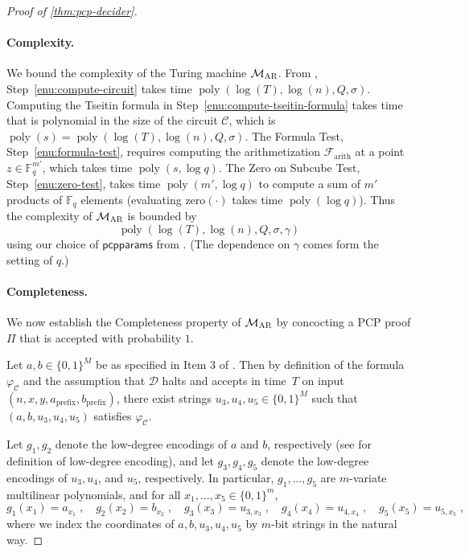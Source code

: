 \documentclass[11pt]{article}
\theoremstyle{definition}
\newcommand{\F}{\ensuremath{\mathbb{F}}}
\DeclareMathOperator{\poly}{poly}
\newcommand{\decider}{\mathcal{D}}
\newcommand{\gamestyle}[1]{\ensuremath{\textsc{#1}}\xspace}
\newcommand{\ar}{\gamestyle{AR}}
\newcommand{\pcpparams}{\mathsf{pcpparams}}
\newcommand{\circuit}{\mathcal{C}}
\newcommand{\formula}{\mathcal{F}}
\newcommand{\pcpverifier}{\mathcal{M}_\ar}
\begin{document}
\begin{proof}[Proof of \cref{thm:pcp-decider}]
\paragraph{Complexity.}
We bound the complexity of the Turing machine $\pcpverifier$.
From ,
Step~\ref{enu:compute-circuit} takes time $\poly(\log(T),\log(n),Q,\sigma)$.
Computing the Tseitin formula in Step~\ref{enu:compute-tseitin-formula} takes
time that is polynomial in the size of the circuit $\circuit$, which is
$\poly(s) = \poly(\log(T),\log(n),Q,\sigma)$.
The Formula Test, Step~\ref{enu:formula-test}, requires computing the
arithmetization $\formula_{\mathrm{arith}}$ at a point $z \in \F_q^{m'}$, which
takes time $\poly(s,\log q)$.
The Zero on Subcube Test, Step~\ref{enu:zero-test}, takes time $\poly(m',\log
q)$ to compute a sum of $m'$ products of $\F_q$ elements (evaluating
$\mathrm{zero}(\cdot)$ takes time $\poly(\log q)$).
Thus the complexity of $\pcpverifier$ is bounded by
\[
  \poly(\log(T),\log(n),Q,\sigma,\gamma)
\]
using our choice of $\pcpparams$ from . (The
dependence on $\gamma$ comes form the setting of $q$.) 
  
  
\paragraph{Completeness.}
We now establish the Completeness property of $\pcpverifier$ by concocting a PCP
proof $\Pi$ that is accepted with probability $1$.
  
Let $a,b \in \{0,1\}^M$ be as specified in Item 3 of .
Then by definition of the formula $\varphi_\circuit$ and the assumption that 
 $\decider$ halts and accepts in time~$T$ on input $(n, x, y,
    a_{\mathrm{prefix}}, b_{\mathrm{prefix}})$, there exist strings
$u_3,u_4,u_5 \in \{0,1\}^M$ such that $(a,b,u_3,u_4,u_5)$ satisfies
$\varphi_\circuit$.
  
Let $g_1,g_2$ denote the low-degree encodings of $a$ and $b$, respectively (see
 for definition of low-degree encoding), and let
$g_3, g_4, g_5$ denote the low-degree encodings of $u_3, u_4$, and
$u_5$, respectively.
In particular, $g_1,\ldots,g_5$ are $m$-variate multilinear polynomials, and for
all $x_1,\ldots,x_5 \in \{0,1\}^m$,
\begin{equation*}
  g_1(x_1) = a_{x_1}\;, \quad
  g_2(x_2) = b_{x_2}\;, \quad
  g_3(x_3) = u_{3,x_3}\;, \quad
  g_4(x_4) = u_{4,x_4}\;, \quad
  g_5(x_5) = u_{5,x_5}\;,
\end{equation*}
where we index the coordinates of $a,b,u_3,u_4,u_5$ by $m$-bit strings in the
natural way.


\end{proof}
\end{document}
